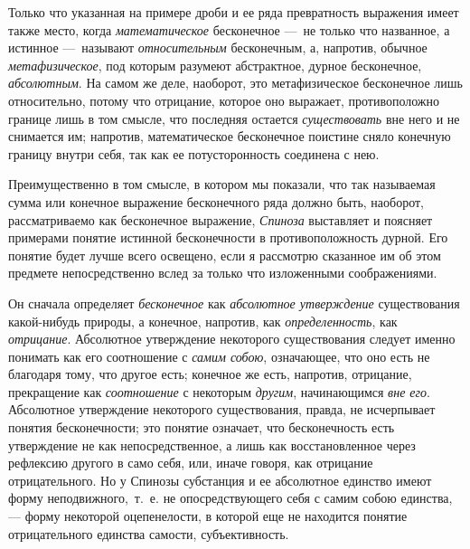 {Только что указанная на примере дроби и ее ряда превратность выражения имеет
также место, когда {\em математическое} бесконечное
—~не только что названное, а истинное —~называют
{\em относительным} бесконечным, а, напротив, обычное
{\em метафизическое}, под которым разумеют абстрактное,
дурное бесконечное, {\em абсолютным}. На самом же деле,
наоборот, это метафизическое бесконечное лишь относительно, потому что
отрицание, которое оно выражает, противоположно границе лишь в том смысле,
что последняя остается {\em существовать} вне него и не
снимается им; напротив, математическое бесконечное поистине сняло конечную
границу внутри себя, так как ее потусторонность соединена с нею.

Преимущественно в том смысле, в котором мы показали, что так называемая
сумма или конечное выражение бесконечного ряда должно быть, наоборот,
рассматриваемо как бесконечное выражение, {\em Спиноза}
выставляет и поясняет примерами понятие истинной бесконечности в
противоположность дурной. Его понятие будет лучше всего освещено, если я
рассмотрю сказанное им об этом предмете непосредственно вслед за только что
изложенными соображениями.

Он сначала определяет {\em бесконечное} как
{\em абсолютное утверждение} существования какой-нибудь
природы, а конечное, напротив, как
{\em определенность}, как
{\em отрицание}. Абсолютное утверждение некоторого
существования следует именно понимать как его соотношение с
{\em самим собою}, означающее, что оно есть не
благодаря тому, что другое есть; конечное же есть, напротив, отрицание,
прекращение как {\em соотношение} с некоторым
{\em другим}, начинающимся {\em вне
его}. Абсолютное утверждение некоторого существования, правда, не
исчерпывает понятия бесконечности; это понятие означает, что бесконечность
есть утверждение не как непосредственное, а лишь как восстановленное через
рефлексию другого в само себя, или, иначе говоря, как отрицание
отрицательного. Но у Спинозы субстанция и ее абсолютное единство имеют
форму неподвижного,~т.~е. не опосредствующего себя с самим собою единства,
— форму некоторой оцепенелости, в которой еще не находится понятие
отрицательного единства самости, субъективность.

}
